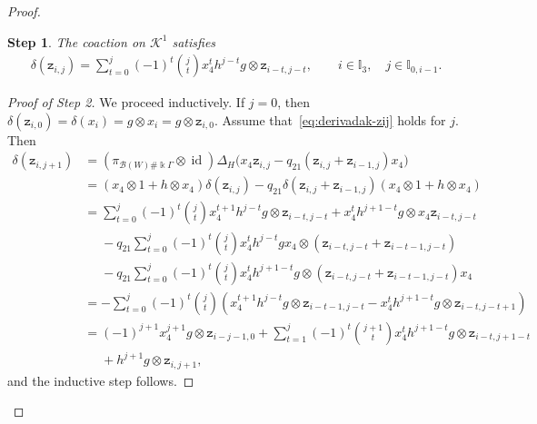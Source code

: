 \documentclass[pdftex]{sigma}
\numberwithin{equation}{section}
\newtheorem{step}{Step}
\newcommand{\id}{\operatorname{id}}
\newcommand{\toba}{\mathscr B}
\newcommand{\K}{{\mathcal{K}}}
\newcommand{\I}{{\mathbb I}}
\newcommand{\zc}[2]{\mathtt{z}_{#1,#2}}
\begin{document}
\begin{proof}
\begin{step}
The coaction on $\K^1$ satisfies
\begin{align*}%
\delta(\zc{i}{j}) = \sum_{t=0}^{j}(-1)^t\binom{j}{t} x_{4}^t h^{j-t}g \otimes \zc{i-t}{j-t},\qquad
 i\in\I_3, \quad j\in\I_{0,i-1}.
\end{align*}
\end{step}

\begin{proof}[Proof of Step 2]
We proceed inductively.
If $j=0$, then $ \delta(\zc{i}{0})=\delta(x_i)=g\otimes x_i =g\otimes \zc{i}{0}$.
Assume that~\eqref{eq:derivadak-zij} holds for $j$. Then
\begin{align*}
\delta ( \zc{i}{j+1}) &= (\pi _{\toba (W)\# \Bbbk \Gamma}\otimes \id)\Delta _{H} \big(x_{4} \zc{i}{j}-q_{21}(\zc{i}{j}+\zc{i-1}{j})x_{4}\big)
\\[1mm]
&= (x_{4}\otimes 1+h\otimes x_{4})\delta(\zc{i}{j})-q_{21}\delta(\zc{i}{j}+\zc{i-1}{j})(x_{4}\otimes 1+h\otimes x_{4})
\\
&=\sum_{t=0}^{j}(-1)^t\binom{j}{t} x_{4}^{t+1} h^{j-t}g \otimes \zc{i-t}{j-t}
+ x_{4}^t h^{j+1-t}g \otimes x_{4}\zc{i-t}{j-t}
\\
&\phantom{=} -q_{21} \sum_{t=0}^{j}(-1)^t\binom{j}{t} x_{4}^{t} h^{j-t}gx_{4} \otimes (\zc{i-t}{j-t}+\zc{i-t-1}{j-t})
\\
&\phantom{=} -q_{21} \sum_{t=0}^{j}(-1)^t\binom{j}{t}x_{4}^t h^{j+1-t}g \otimes (\zc{i-t}{j-t}+\zc{i-t-1}{j-t})x_{4}
\\
&=-\sum_{t=0}^{j}(-1)^t\binom{j}{t} (x_{4}^{t+1} h^{j-t}g \otimes \zc{i-t-1}{j-t}
- x_{4}^t h^{j+1-t}g \otimes \zc{i-t}{j-t+1})
\\
&= (-1)^{j+1} x_{4}^{j+1} g \otimes \zc{i-j-1}{0}
+\sum_{t=1}^{j}(-1)^t\binom{j+1}{t} x_{4}^t h^{j+1-t}g \otimes \zc{i-t}{j+1-t}
\\
&\phantom{=} +h^{j+1}g \otimes \zc{i}{j+1},
\end{align*}
and the inductive step follows.
\end{proof}




\end{proof}
\end{document}
